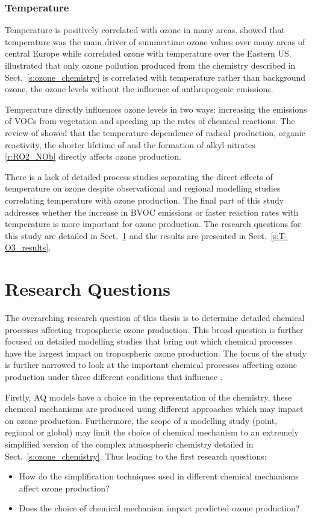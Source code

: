 \subsubsection{Temperature}
Temperature is positively correlated with ozone in many areas.
\citet{Otero:2016} showed that temperature was the main driver of summertime ozone values over many areas of central Europe while \citet{Camalier:2007} correlated ozone with temperature over the Eastern US.
\citet{Sillman:1995a} illustrated that only ozone pollution produced from the chemistry described in Sect.~\ref{s:ozone_chemistry} is correlated with temperature rather than background ozone, the ozone levels without the influence of anthropogenic emissions.

Temperature directly influences ozone levels in two ways: increasing the emissions of VOCs from vegetation and speeding up the rates of chemical reactions.
The review of \citet{Pusede:2015} showed that the temperature dependence of radical production, organic reactivity, the shorter lifetime of  and the formation of alkyl nitrates \eqref{r:RO2_NOb} directly affects ozone production.

There is a lack of detailed process studies separating the direct effects of temperature on ozone despite observational and regional modelling studies correlating temperature with ozone production. 
The final part of this study addresses whether the increase in BVOC emissions or faster reaction rates with temperature is more important for ozone production.
The research questions for this study are detailed in Sect.~\ref{s:research_questions} and the results are presented in Sect.~\ref{s:T-O3_results}.

\section{Research Questions} \label{s:research_questions}
The overarching research question of this thesis is to determine detailed chemical processes affecting tropospheric ozone production.
This broad question is further focused on detailed modelling studies that bring out which chemical processes have the largest impact on tropospheric ozone production.
The focus of the study is further narrowed to look at the important chemical processes affecting ozone production under three different conditions that influence .

Firstly, AQ models have a choice in the representation of the chemistry, these chemical mechanisms are produced using different approaches which may impact on ozone production.
Furthermore, the scope of a modelling study (point, regional or global) may limit the choice of chemical mechanism to an extremely simplified version of the complex atmospheric chemistry detailed in Sect.~\ref{s:ozone_chemistry}.
Thus leading to the first research questions:
\begin{itemize}
	\item How do the simplification techniques used in different chemical mechanisms affect ozone production? 
    \item Does the choice of chemical mechanism impact predicted ozone production?
\end{itemize}

